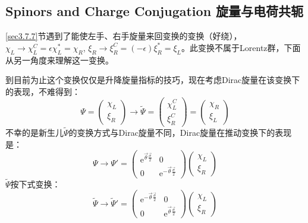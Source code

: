 \subsection[旋量与电荷共轭]{Spinors and Charge Conjugation \quad 旋量与电荷共轭}
\label{sec3.7.10}
\ref{sec3.7.7}节遇到了能使左手、右手旋量来回变换的变换（好绕），$\chi_L \rightarrow \chi_L^C = \epsilon \chi_L^* =  \chi_R$, $\xi_R \rightarrow \xi_R^C = (-\epsilon) \xi_R^* = \xi_L$。此变换不属于Lorentz群，下面从另一角度来理解这一变换。

到目前为止这个变换仅仅是升降旋量指标的技巧，现在考虑Dirac旋量在该变换下的表现，不难得到：
\begin{equation}
\label{equ3.233}
    \Psi =
        \begin{pmatrix}
            \chi_L \\ \xi_R
        \end{pmatrix}
    \rightarrow \tilde{\Psi} =
        \begin{pmatrix}
            \chi_L^C \\ \xi_R^C
        \end{pmatrix}
    =
        \begin{pmatrix}
            \chi_R \\ \xi_L
        \end{pmatrix}
\end{equation}
不幸的是新生儿$\tilde{\Psi}$的变换方式与Dirac旋量不同，Dirac旋量在推动变换下的表现是：
\begin{equation}
\label{equ3.234}
    \Psi \rightarrow \Psi' =
        \begin{pmatrix}
            \mathrm{e}^{\vec{\theta} \frac{\vec{\sigma}}{2}} & 0 \\
            0 & \mathrm{e}^{-\vec{\theta} \frac{\vec{\sigma}}{2}}
        \end{pmatrix}
        \begin{pmatrix}
            \chi_L \\ \xi_R
        \end{pmatrix}
\end{equation}
$\tilde{\Psi}$按下式变换：
\begin{equation}
\label{equ3.235}
    \tilde{\Psi} \rightarrow \tilde{\Psi}' =
        \begin{pmatrix}
            \mathrm{e}^{-\vec{\theta} \frac{\vec{\sigma}}{2}} & 0 \\
            0 & \mathrm{e}^{\vec{\theta} \frac{\vec{\sigma}}{2}}
        \end{pmatrix}
        \begin{pmatrix}
            \chi_L \\ \xi_R
        \end{pmatrix}
\end{equation}
